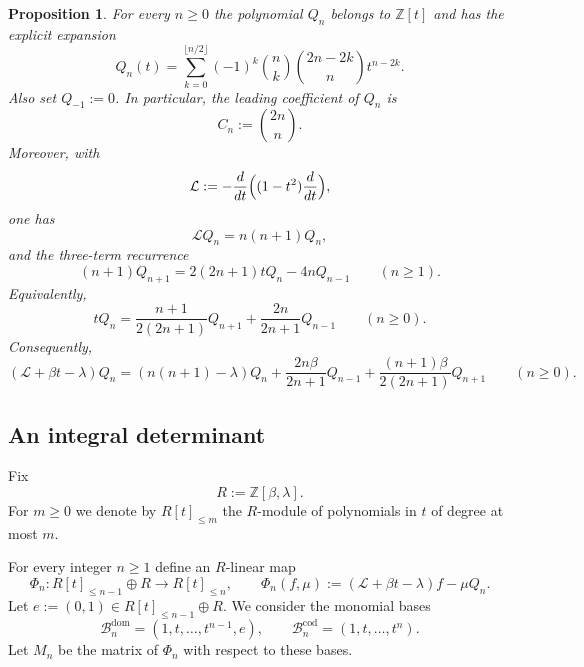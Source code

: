 \documentclass[11pt,letterpaper]{amsart}
\numberwithin{equation}{section}
\theoremstyle{plain}
\newtheorem{proposition}[theorem]{Proposition}
\theoremstyle{remark}
\newcommand{\Z}{\mathbb{Z}}
\begin{document}
\begin{proposition}\label{prop:Legendre-facts}
For every $n\ge 0$ the polynomial $Q_n$ belongs to $\Z[t]$ and has the explicit expansion
\begin{equation}\label{eq:Q-explicit}
 Q_n(t)=\sum_{k=0}^{\lfloor n/2\rfloor}
 (-1)^k\binom{n}{k}\binom{2n-2k}{n}t^{n-2k}.
\end{equation}
Also set \(Q_{-1}:=0\). In particular, the leading coefficient of $Q_n$ is
\begin{equation}\label{eq:Cn}
 C_n:=\binom{2n}{n}.
\end{equation}
Moreover, with
\begin{equation}\label{eq:L-operator}
 \mathcal L:=-\frac{d}{dt}\Bigl((1-t^2)\frac{d}{dt}\Bigr),
\end{equation}
one has
\begin{equation}\label{eq:Legendre-eigen}
 \mathcal LQ_n=n(n+1)Q_n,
\end{equation}
and the three-term recurrence
\begin{equation}\label{eq:Q-recurrence}
 (n+1)Q_{n+1}=2(2n+1)tQ_n-4nQ_{n-1}
 \qquad(n\ge 1).
\end{equation}
Equivalently,
\begin{equation}\label{eq:tQn}
 tQ_n=\frac{n+1}{2(2n+1)}Q_{n+1}+\frac{2n}{2n+1}Q_{n-1}
 \qquad(n\ge 0).
\end{equation}
Consequently,
\begin{equation}\label{eq:operator-on-Q}
 (\mathcal L+\beta t-\lambda)Q_n
 =(n(n+1)-\lambda)Q_n
 +\frac{2n\beta}{2n+1}Q_{n-1}
 +\frac{(n+1)\beta}{2(2n+1)}Q_{n+1}
 \qquad(n\ge 0).
\end{equation}
\end{proposition}



\subsection{An integral determinant}

Fix
\[
 R:=\Z[\beta,\lambda].
\]
For $m\ge 0$ we denote by $R[t]_{\le m}$ the $R$-module of polynomials in $t$ of degree at most $m$.

For every integer $n\ge 1$ define an $R$-linear map
\begin{equation}\label{eq:Phi-def}
 \Phi_n:R[t]_{\le n-1}\oplus R\longrightarrow R[t]_{\le n},
 \qquad
 \Phi_n(f,\mu):=(\mathcal L+\beta t-\lambda)f-\mu Q_n.
\end{equation}
Let $e:=(0,1)\in R[t]_{\le n-1}\oplus R$. We consider the monomial bases
\[
 \mathcal B_n^{\mathrm{dom}}=(1,t,\dots,t^{n-1},e),
 \qquad
 \mathcal B_n^{\mathrm{cod}}=(1,t,\dots,t^n).
\]
Let $M_n$ be the matrix of $\Phi_n$ with respect to these bases.
\end{document}
